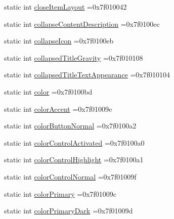 \begin{DoxyCompactItemize}
\item 
static int \hyperlink{classandroid_1_1support_1_1v7_1_1recyclerview_1_1R_1_1attr_a654c9ca4dd9811de1dd03792a435c737}{close\+Item\+Layout} =0x7f010042
\item 
static int \hyperlink{classandroid_1_1support_1_1v7_1_1recyclerview_1_1R_1_1attr_a3f7346ed4676d518b47a6a426632c6fc}{collapse\+Content\+Description} =0x7f0100ec
\item 
static int \hyperlink{classandroid_1_1support_1_1v7_1_1recyclerview_1_1R_1_1attr_ac5447ae537ecc4297c8e7ff5ff6f2efe}{collapse\+Icon} =0x7f0100eb
\item 
static int \hyperlink{classandroid_1_1support_1_1v7_1_1recyclerview_1_1R_1_1attr_a7cfaa293b4e2c7652d0b5bc580dd7d79}{collapsed\+Title\+Gravity} =0x7f010108
\item 
static int \hyperlink{classandroid_1_1support_1_1v7_1_1recyclerview_1_1R_1_1attr_a13db686506a7e89fffa5db487b138abb}{collapsed\+Title\+Text\+Appearance} =0x7f010104
\item 
static int \hyperlink{classandroid_1_1support_1_1v7_1_1recyclerview_1_1R_1_1attr_ad0373f8f0633a36313f67e07e056422d}{color} =0x7f0100bd
\item 
static int \hyperlink{classandroid_1_1support_1_1v7_1_1recyclerview_1_1R_1_1attr_a9623888efd01b3dafab806bc5fcad415}{color\+Accent} =0x7f01009e
\item 
static int \hyperlink{classandroid_1_1support_1_1v7_1_1recyclerview_1_1R_1_1attr_a56dfc59cf465f2eca091254e34c69ef0}{color\+Button\+Normal} =0x7f0100a2
\item 
static int \hyperlink{classandroid_1_1support_1_1v7_1_1recyclerview_1_1R_1_1attr_ac25a683b74348a5ebcfaca1be8c0cbb4}{color\+Control\+Activated} =0x7f0100a0
\item 
static int \hyperlink{classandroid_1_1support_1_1v7_1_1recyclerview_1_1R_1_1attr_abfbf02cd9adb806ed47a4d0a8b78ab54}{color\+Control\+Highlight} =0x7f0100a1
\item 
static int \hyperlink{classandroid_1_1support_1_1v7_1_1recyclerview_1_1R_1_1attr_add6b98d7c055e7c1e5efbed4fc5bb5b5}{color\+Control\+Normal} =0x7f01009f
\item 
static int \hyperlink{classandroid_1_1support_1_1v7_1_1recyclerview_1_1R_1_1attr_ae1b5ea09038701fbb0d40198261c2856}{color\+Primary} =0x7f01009c
\item 
static int \hyperlink{classandroid_1_1support_1_1v7_1_1recyclerview_1_1R_1_1attr_a7f6fd72e821021b93f78c8633340e2b8}{color\+Primary\+Dark} =0x7f01009d
\item 

\end{DoxyCompactItemize}
